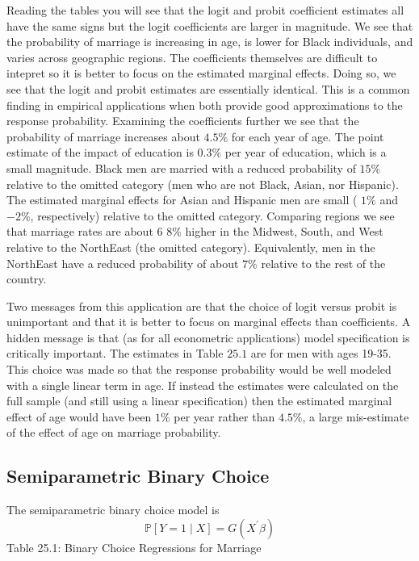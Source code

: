 \documentclass[10pt]{article}
\begin{document}
Reading the tables you will see that the logit and probit coefficient estimates all have the same signs but the logit coefficients are larger in magnitude. We see that the probability of marriage is increasing in age, is lower for Black individuals, and varies across geographic regions. The coefficients themselves are difficult to intepret so it is better to focus on the estimated marginal effects. Doing so, we see that the logit and probit estimates are essentially identical. This is a common finding in empirical applications when both provide good approximations to the response probability. Examining the coefficients further we see that the probability of marriage increases about $4.5 \%$ for each year of age. The point estimate of the impact of education is $0.3 \%$ per year of education, which is a small magnitude. Black men are married with a reduced probability of $15 \%$ relative to the omitted category (men who are not Black, Asian, nor Hispanic). The estimated marginal effects for Asian and Hispanic men are small ( $1 \%$ and $-2 \%$, respectively) relative to the omitted category. Comparing regions we see that marriage rates are about 6 8\% higher in the Midwest, South, and West relative to the NorthEast (the omitted category). Equivalently, men in the NorthEast have a reduced probability of about $7 \%$ relative to the rest of the country.

Two messages from this application are that the choice of logit versus probit is unimportant and that it is better to focus on marginal effects than coefficients. A hidden message is that (as for all econometric applications) model specification is critically important. The estimates in Table $25.1$ are for men with ages 19-35. This choice was made so that the response probability would be well modeled with a single linear term in age. If instead the estimates were calculated on the full sample (and still using a linear specification) then the estimated marginal effect of age would have been $1 \%$ per year rather than $4.5 \%$, a large mis-estimate of the effect of age on marriage probability.

\subsection{Semiparametric Binary Choice}
The semiparametric binary choice model is
$$
\mathbb{P}[Y=1 \mid X]=G\left(X^{\prime} \beta\right)
$$
Table 25.1: Binary Choice Regressions for Marriage
\end{document}
